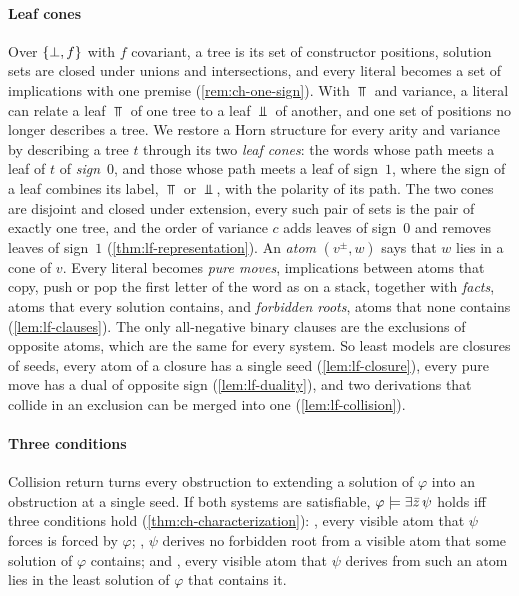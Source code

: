 \paragraph{Leaf cones}
Over $\{\bot,f\}$ with $f$ covariant, a tree is its set of constructor positions,
solution sets are closed under unions and intersections, and every literal
becomes a set of implications with one premise (\cref{rem:ch-one-sign}).
With $\Top$ and variance, a literal can relate a leaf $\Top$ of one tree to a
leaf $\Bot$ of another, and one set of positions no longer describes a tree.
We restore a Horn structure for every arity and variance by describing a tree
$t$ through
its two \emph{leaf cones}: the words whose path meets a leaf of $t$ of
\emph{sign}~$0$, and those whose path meets a leaf of sign~$1$, where the sign
of a leaf combines its label, $\Top$ or $\Bot$, with the polarity of its path.
The two cones are disjoint and closed under extension, every such pair of sets
is the pair of exactly one tree, and the order of variance $c$ adds leaves of
sign~$0$ and removes leaves of sign~$1$ (\cref{thm:lf-representation}). An
\emph{atom} $(v^\pm,w)$ says that $w$ lies in a cone of $v$. Every literal
becomes \emph{pure moves}, implications between atoms that copy, push or pop
the first letter of the word as on a stack, together with \emph{facts}, atoms
that every solution contains, and \emph{forbidden roots}, atoms that none
contains (\cref{lem:lf-clauses}). The only all-negative binary clauses are the
exclusions of opposite atoms, which are the same for every system. So least models are
closures of seeds, every atom of a closure has a single seed
(\cref{lem:lf-closure}), every pure move has a dual of opposite sign
(\cref{lem:lf-duality}), and two derivations that collide in an exclusion can
be merged into one (\cref{lem:lf-collision}).

\paragraph{Three conditions}
Collision return turns every obstruction to extending a solution of $\varphi$
into an obstruction at a single seed. If both systems are satisfiable,
$\varphi\models\exists\bar z\,\psi$ holds iff three conditions hold
(\cref{thm:ch-characterization}): \CondI, every visible atom that $\psi$
forces is forced by $\varphi$; \CondU, $\psi$ derives no forbidden root from a
visible atom that some solution of $\varphi$ contains; and \CondII, every
visible atom that $\psi$ derives from such an atom lies in the least solution
of $\varphi$ that contains it.

